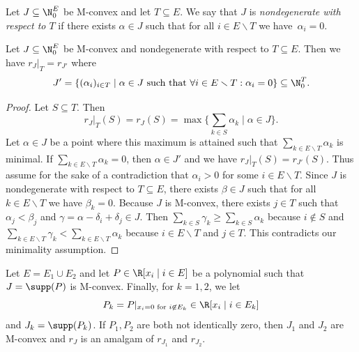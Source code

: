 \begin{Def}
    Let $J\subseteq\N_0^E$ be M-convex and let $T\subseteq E$. We say that $J$ is \emph{nondegenerate with respect to $T$} if there exists $\alpha\in J$ such that for all $i\in E\smallsetminus T$ we have~$\alpha_i=0$.
\end{Def}

\begin{lem}\label{lem:mconvrest}
    Let $J\subseteq\N_0^E$ be M-convex and nondegenerate with respect to $T\subseteq E$. Then we have $r_J|_T=r_{J'}$ where
    \begin{equation*}
        J'=\{(\alpha_i)_{i\in T}\mid \alpha\in J\textrm{ such that }\forall i\in E\smallsetminus T: \alpha_i=0\}\subseteq\N_0^T.
    \end{equation*}
\end{lem}

\begin{proof}
    Let $S\subseteq T$. Then
    \begin{equation*}
        r_J|_T(S)=r_J(S)=\max\{\sum_{k\in S}\alpha_k\mid \alpha\in J\}.
    \end{equation*}
    Let $\alpha\in J$ be a point where this maximum is attained such that $\sum_{k\in E\smallsetminus T}\alpha_k$ is minimal. If $\sum_{k\in E\smallsetminus T}\alpha_k=0$, then $\alpha\in J'$ and we have $r_J|_T(S)=r_{J'}(S)$. Thus assume for the sake of a contradiction that $\alpha_i>0$ for some $i\in E\smallsetminus T$. Since $J$ is nondegenerate with respect to $T\subseteq E$, there exists $\beta\in J$ such that for all $k\in E\smallsetminus T$ we have $\beta_k=0$. Because $J$ is M-convex, there exists $j\in T$ such that $\alpha_j<\beta_j$ and $\gamma=\alpha-\delta_i+\delta_j\in J$. Then $\sum_{k\in S}\gamma_k\geq\sum_{k\in S}\alpha_k$ because $i\not\in S$ and $\sum_{k\in E\smallsetminus T}\gamma_k<\sum_{k\in E\smallsetminus T}\alpha_k$ because $i\in E\smallsetminus T$ and $j\in T$. This contradicts our minimality assumption.
\end{proof}

\begin{cor}\label{cor:polyamal}
    Let $E=E_1\cup E_2$ and let $P\in\R[x_i\mid i\in E]$ be a polynomial such that $J=\supp(P)$ is M-convex.
    Finally, for $k=1,2$, we let
    \begin{equation*}
        P_k=P|_{x_i=0\textrm{ for }i\not\in E_k}\in \R[x_i\mid i\in E_k]
    \end{equation*}
    and $J_k=\supp(P_k)$. If $P_1,P_2$ are both not identically zero, then $J_1$ and $J_2$ are M-convex and $r_J$ is an amalgam of $r_{J_1}$ and $r_{J_2}$.
\end{cor}

